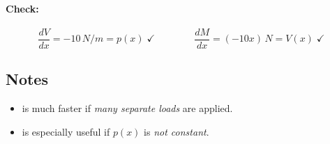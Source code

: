 \documentclass[11pt]{article}
\begin{document}
\paragraph{Check:}
\[
  \frac{dV}{dx} = -10\,\si{N/m} = p(x)\;\checkmark
  \qquad\qquad
  \frac{dM}{dx} = (-10x)\,\si{N} = V(x)\;\checkmark
\]

\subsection*{Notes}
\begin{itemize}[label={}, leftmargin=2.5em]
  \item[\circnum{1}] is much faster if \emph{many separate loads} are applied.
  \item[\circnum{2}] is especially useful if $p(x)$ is \emph{not constant}.
\end{itemize}
\end{document}
